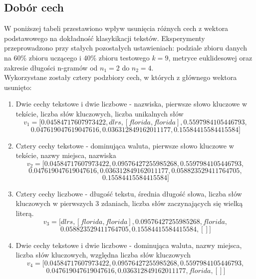 \documentclass{article}
\begin{document}
\subsection{Dobór cech}
W poniższej tabeli przestawiono wpływ usunięcia różnych cech z wektora podstawowego na dokładność klasykikacji tekstów. Eksperymenty przeprowadzono przy stałych pozostałych ustawieniach: podziale zbioru danych na 60\% zbioru uczącego i 40\% zbioru testowego \(k = 9\), metryce euklidesowej oraz zakresie długości n-gramów od \(n_1 = 2\) do \(n_2 = 4\). \\
Wykorzystane zostały cztery podzbiory cech, w których z głównego wektora usunięto:
\begin{enumerate}
    \item Dwie cechy tekstowe i dwie liczbowe - nazwiska, pierwsze słowo kluczowe w tekście, liczba słów kluczowych, liczba unikalnych słów
    \[
    v_1 = [ 0.04584717607973422, dlrs, [ florida, florida], 0.5597984105446793, 
    \]
    \[
         0.047619047619047616, 0.036312849162011177, 0.15584415584415584 ]
    \]
    \item Cztery cechy tekstowe - dominująca waluta, pierwsze słowo kluczowe w tekście, nazwy miejsca, nazwiska
    \[
    v_2 = [ 0.04584717607973422, 0.09576427255985268, 0.5597984105446793, 
    \]
    \[
          0.047619047619047616, 0.036312849162011177, 0.058823529411764705, 
    \]
    \[
        0.15584415584415584 ]
    \]
    \item Cztery cechy liczbowe - długość tekstu, średnia długość słowa, liczba słów kluczowych w pierwszych 3 zdaniach, liczba słów zaczynających się wielką literą.
    \[
    v_3 = [  dlrs, [ florida, florida], 0.09576427255985268, florida,
\]
\[
     0.058823529411764705, 0.15584415584415584, [] ]
\]
    \item Dwie cechy tekstowe i dwie liczbowe - dominująca waluta, nazwy miejsca, liczba słów kluczowych, względna liczba słów kluczowych
    \[
    v_4 = [ 0.04584717607973422, 0.09576427255985268, 0.5597984105446793, 
\]
\[
     0.047619047619047616, 0.036312849162011177, florida, [] ]
\]

\end{enumerate}
\end{document}
